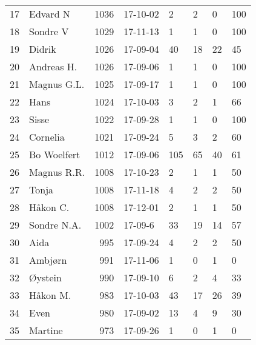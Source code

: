\begin{longtable}{|r|l|r|l|l|l|l|l|}
17 &             Edvard N &  1036 &    17-10-02 &               2 &     2 &       0 &       100 \\
18 &             Sondre V &  1029 &    17-11-13 &               1 &     1 &       0 &       100 \\
19 &               Didrik &  1026 &    17-09-04 &              40 &    18 &      22 &        45 \\
20 &           Andreas H. &  1026 &    17-09-06 &               1 &     1 &       0 &       100 \\
21 &          Magnus G.L. &  1025 &    17-09-17 &               1 &     1 &       0 &       100 \\
22 &                 Hans &  1024 &    17-10-03 &               3 &     2 &       1 &        66 \\
23 &                Sisse &  1022 &    17-09-28 &               1 &     1 &       0 &       100 \\
24 &             Cornelia &  1021 &    17-09-24 &               5 &     3 &       2 &        60 \\
25 &          Bo Woelfert &  1012 &    17-09-06 &             105 &    65 &      40 &        61 \\
26 &          Magnus R.R. &  1008 &    17-10-23 &               2 &     1 &       1 &        50 \\
27 &                Tonja &  1008 &    17-11-18 &               4 &     2 &       2 &        50 \\
28 &             Håkon C. &  1008 &    17-12-01 &               2 &     1 &       1 &        50 \\
29 &          Sondre N.A. &  1002 &     17-09-6 &              33 &    19 &      14 &        57 \\
30 &                 Aida &   995 &    17-09-24 &               4 &     2 &       2 &        50 \\
31 &              Ambjørn &   991 &    17-11-06 &               1 &     0 &       1 &         0 \\
32 &              Øystein &   990 &    17-09-10 &               6 &     2 &       4 &        33 \\
33 &             Håkon M. &   983 &    17-10-03 &              43 &    17 &      26 &        39 \\
34 &                 Even &   980 &    17-09-02 &              13 &     4 &       9 &        30 \\
35 &              Martine &   973 &    17-09-26 &               1 &     0 &       1 &         0 \\

\end{longtable}
